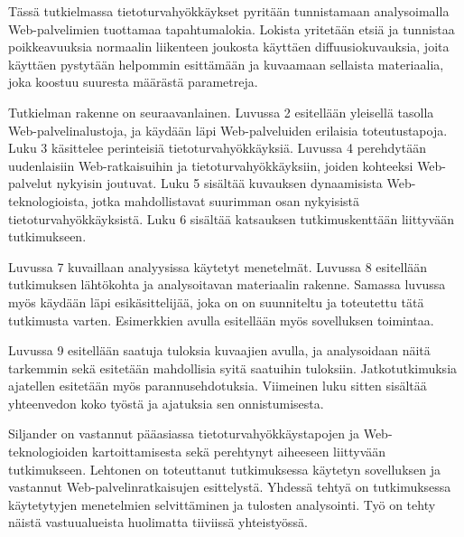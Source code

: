 Tässä tutkielmassa tietoturvahyökkäykset pyritään tunnistamaan analysoimalla 
Web-palvelimien tuottamaa tapahtumalokia. Lokista yritetään etsiä ja tunnistaa
poikkeavuuksia normaalin liikenteen joukosta käyttäen diffuusiokuvauksia, joita 
käyttäen pystytään helpommin esittämään ja kuvaamaan sellaista materiaalia, joka 
koostuu suuresta määrästä parametreja.

Tutkielman rakenne on seuraavanlainen. Luvussa 2 esitellään yleisellä
tasolla Web-palvelinalustoja, ja käydään läpi Web-palveluiden
erilaisia toteutustapoja. Luku 3 käsittelee perinteisiä
tietoturvahyökkäyksiä. Luvussa 4 perehdytään uudenlaisiin
Web-ratkaisuihin ja tietoturvahyökkäyksiin, joiden kohteeksi
Web-palvelut nykyisin joutuvat.  Luku 5 sisältää kuvauksen
dynaamisista Web-teknologioista, jotka mahdollistavat suurimman osan
nykyisistä tietoturvahyökkäyksistä. Luku 6 sisältää katsauksen
tutkimuskenttään liittyvään tutkimukseen.

Luvussa 7 kuvaillaan analyysissa käytetyt menetelmät. Luvussa 8
esitellään tutkimuksen lähtökohta ja analysoitavan materiaalin rakenne.
Samassa luvussa myös käydään läpi esikäsittelijää, joka on on suunniteltu 
ja toteutettu tätä tutkimusta varten. Esimerkkien avulla esitellään myös 
sovelluksen toimintaa.

Luvussa 9 esitellään saatuja tuloksia kuvaajien avulla, ja
analysoidaan näitä tarkemmin sekä esitetään mahdollisia syitä
saatuihin tuloksiin. Jatkotutkimuksia ajatellen esitetään
myös parannusehdotuksia. Viimeinen luku sitten sisältää
yhteenvedon koko työstä ja ajatuksia sen onnistumisesta.

Siljander on vastannut pääasiassa tietoturvahyökkäystapojen ja
Web-\-teknologioiden kartoittamisesta sekä perehtynyt aiheeseen
liittyvään tutkimukseen. Lehtonen on toteuttanut tutkimuksessa
käytetyn sovelluksen ja vastannut Web-\-palvelinratkaisujen
esittelystä. Yhdessä tehtyä on tutkimuksessa käytetytyjen menetelmien
selvittäminen ja tulosten analysointi. Työ on tehty näistä
vastuualueista huolimatta tiiviissä yhteistyössä.
